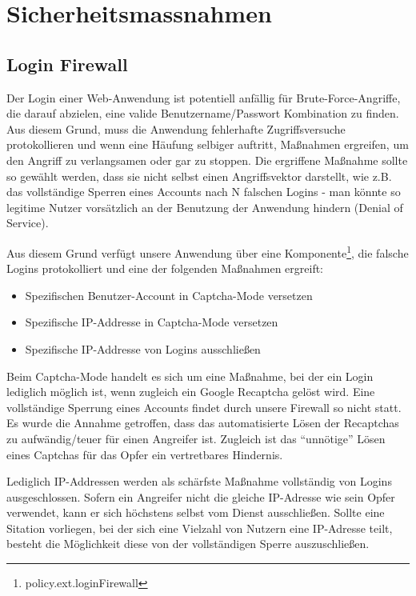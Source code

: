 \documentclass[12pt,DIV14,BCOR10mm,a4paper,parskip=half-,headsepline,headinclude,english,ngerman,bibliography=totocnumbered]{scrreprt}
\begin{document}
\chapter{Sicherheitsmassnahmen}

\section{Login Firewall}
Der Login einer Web-Anwendung ist potentiell anfällig für Brute-Force-Angriffe, die darauf abzielen, eine valide Benutzername/Passwort Kombination zu finden. Aus diesem Grund, muss die Anwendung fehlerhafte Zugriffsversuche protokollieren und wenn eine Häufung selbiger auftritt, Maßnahmen ergreifen, um den Angriff zu verlangsamen oder gar zu stoppen. Die ergriffene Maßnahme sollte so gewählt werden, dass sie nicht selbst einen Angriffsvektor darstellt, wie z.B. das vollständige Sperren eines Accounts nach N falschen Logins - man könnte so legitime Nutzer vorsätzlich an der Benutzung der Anwendung hindern (Denial of Service).

Aus diesem Grund verfügt unsere Anwendung über eine Komponente\footnote{policy.ext.loginFirewall}, die falsche Logins protokolliert und eine der folgenden Maßnahmen ergreift:

\begin{itemize}
\item Spezifischen Benutzer-Account in Captcha-Mode versetzen
\item Spezifische IP-Addresse in Captcha-Mode versetzen
\item Spezifische IP-Addresse von Logins ausschließen
\end{itemize}

Beim Captcha-Mode handelt es sich um eine Maßnahme, bei der ein Login lediglich möglich ist, wenn zugleich ein Google Recaptcha gelöst wird. Eine vollständige Sperrung eines Accounts findet durch unsere Firewall so nicht statt. Es wurde die Annahme getroffen, dass das automatisierte Lösen der Recaptchas zu aufwändig/teuer für einen Angreifer ist. Zugleich ist das ``unnötige'' Lösen eines Captchas für das Opfer ein vertretbares Hindernis.

Lediglich IP-Addressen werden als schärfste Maßnahme vollständig von Logins ausgeschlossen. Sofern ein Angreifer nicht die gleiche IP-Adresse wie sein Opfer verwendet, kann er sich höchstens selbst vom Dienst ausschließen. Sollte eine Sitation vorliegen, bei der sich eine Vielzahl von Nutzern eine IP-Adresse teilt, besteht die Möglichkeit diese von der vollständigen Sperre auszuschließen.
\end{document}
